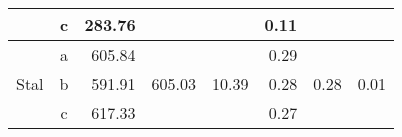 \begin{table}[H]
{\begin{tabular}{|c|c|r|r|r|r|r|r|}
                                                                                                     & c        & 283.76                                                                        &                                                                                     &                                                                                       & 0.11                                                                          &                                                                                     &                                                                                       \\ \hline
    \multirow{3}{*}{Stal}                                                                            & a        & 605.84                                                                        & \multirow{3}{*}{605.03}                                                             & \multirow{3}{*}{10.39}                                                                & 0.29                                                                          & \multirow{3}{*}{0.28}                                                               & \multirow{3}{*}{0.01}                                                                 \\ \cline{2-3} \cline{6-6}
                                                                                                     & b        & 591.91                                                                        &                                                                                     &                                                                                       & 0.28                                                                          &                                                                                     &                                                                                       \\ \cline{2-3} \cline{6-6}
                                                                                                     & c        & 617.33                                                                        &                                                                                     &                                                                                       & 0.27                                                                          &                                                                                     &                                                                                       \\ \hline
    \end{tabular}%
    }
    \end{table}